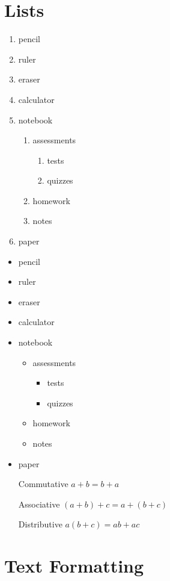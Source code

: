 \documentclass[12pt]{article}
\begin{document}
\section{Lists}

\begin{enumerate}
\item pencil
\item ruler
\item eraser
\item calculator
\item notebook
	\begin{enumerate}
	\item assessments
		\begin{enumerate}
		\item tests
		\item quizzes
		\end{enumerate}
	\item homework
	\item notes
	\end{enumerate}
\item paper
\end{enumerate}

\begin{itemize}
\item pencil
\item ruler
\item eraser
\item calculator
\item notebook
	\begin{itemize}
	\item assessments
		\begin{itemize}
		\item tests
		\item quizzes
		\end{itemize}
	\item homework
	\item notes
	\end{itemize}
\item paper
\end{itemize}

\begin{enumerate}
\item[Commutative] $a+b=b+a$
\item[Associative] $(a+b)+c=a+(b+c)$
\item[Distributive] $a(b+c)=ab+ac$
\end{enumerate}

\section{Text Formatting}
\end{document}
